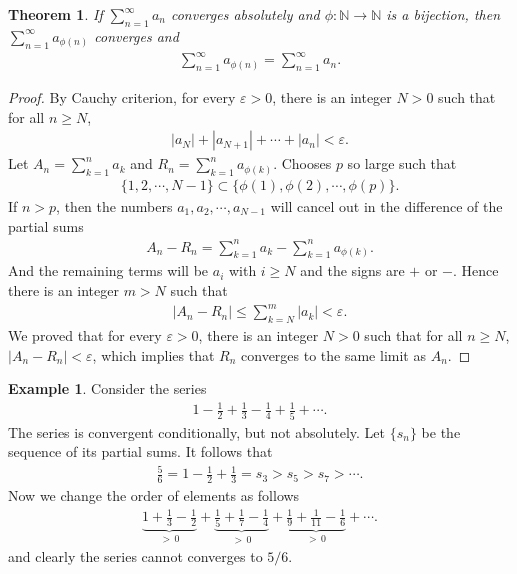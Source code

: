 \documentclass[10pt]{book}
\newtheorem{theorem}{Theorem}[chapter]
\theoremstyle{definition}
\newtheorem{example}{Example}[chapter]
\numberwithin{equation}{chapter}
\begin{document}
\medskip

\begin{theorem}
If $\sum^\infty_{n=1} a_n$ converges absolutely and $\phi: \mathbb{N} \to \mathbb{N}$ is a bijection, then $\sum^\infty_{n=1} a_{\phi(n)}$ converges and 
\begin{align*}
    \sum^\infty_{n=1} a_{\phi(n)} = \sum^\infty_{n=1} a_n.
\end{align*}
\end{theorem}
\begin{proof}
By Cauchy criterion, for every $\varepsilon > 0$, there is an integer $N > 0$ such that for all $n \geq N$,
\begin{align*}
    \left|a_N\right| + \left|a_{N+1}\right| + \cdots + \left|a_n\right| < \varepsilon.
\end{align*}
Let $A_n = \sum^n_{k=1} a_k$ and $R_n = \sum^n_{k=1} a_{\phi(k)}$. Chooses $p$ so large such that
\begin{align*}
    \{1,2,\cdots,N-1\} \subset \{\phi(1),\phi(2),\cdots,\phi(p)\}.
\end{align*}
If $n > p$, then the numbers $a_1,a_2, \cdots, a_{N-1}$ will cancel out in the difference of the partial sums
\begin{align*}
    A_n - R_n = \sum^n_{k=1} a_k - \sum^n_{k=1} a_{\phi(k)}.
\end{align*}
And the remaining terms will be $a_i$ with $i \geq N$ and the signs are $+$ or $-$. Hence there is an integer $m > N$ such that 
\begin{align*}
    \left|A_n - R_n\right| \leq \sum^m_{k=N} \left|a_k\right| < \varepsilon.
\end{align*}
We proved that for every $\varepsilon > 0$, there is an integer $N > 0$ such that for all $n \geq N$, $\left|A_n - R_n\right| < \varepsilon$, which implies that $R_n$ converges to the same limit as $A_n$.
\end{proof}

\medskip

\begin{example}
Consider the series
\begin{align*}
    1 - \frac{1}{2} + \frac{1}{3} - \frac{1}{4} + \frac{1}{5} + \cdots.
\end{align*}
The series is convergent conditionally, but not absolutely. Let $\{s_n\}$ be the sequence of its partial sums. It follows that
\begin{align*}
    \frac{5}{6} = 1 - \frac{1}{2} + \frac{1}{3} = s_3 > s_5 > s_7 > \cdots.
\end{align*}
Now we change the order of elements as follows
\begin{align*}
    \underbrace{1 + \frac{1}{3} - \frac{1}{2}}_{>\,0} + \underbrace{\frac{1}{5} + \frac{1}{7} - \frac{1}{4}}_{>\,0} + \underbrace{\frac{1}{9} + \frac{1}{11} - \frac{1}{6}}_{>\,0} + \cdots.
\end{align*}
and clearly the series cannot converges to $5/6$.
\end{example}
\end{document}
